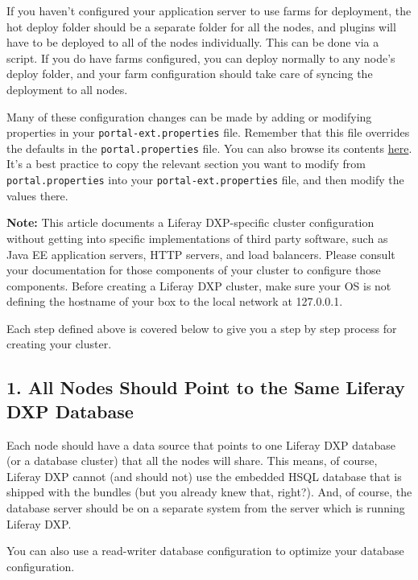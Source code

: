 If you haven't configured your application server to use farms for
deployment, the hot deploy folder should be a separate folder for all
the nodes, and plugins will have to be deployed to all of the nodes
individually. This can be done via a script. If you do have farms
configured, you can deploy normally to any node's deploy folder, and
your farm configuration should take care of syncing the deployment to
all nodes.

Many of these configuration changes can be made by adding or modifying
properties in your \texttt{portal-ext.properties} file. Remember that
this file overrides the defaults in the \texttt{portal.properties} file.
You can also browse its contents
\href{https://docs.liferay.com/digital-enterprise/7.0-latest/propertiesdoc/portal.properties.html}{here}.
It's a best practice to copy the relevant section you want to modify
from \texttt{portal.properties} into your \texttt{portal-ext.properties}
file, and then modify the values there.

\noindent\hrulefill

\textbf{Note:} This article documents a Liferay DXP-specific cluster
configuration without getting into specific implementations of third
party software, such as Java EE application servers, HTTP servers, and
load balancers. Please consult your documentation for those components
of your cluster to configure those components. Before creating a Liferay
DXP cluster, make sure your OS is not defining the hostname of your box
to the local network at 127.0.0.1.

\noindent\hrulefill

Each step defined above is covered below to give you a step by step
process for creating your cluster.

\subsection{1. All Nodes Should Point to the Same Liferay DXP
Database}\label{all-nodes-should-point-to-the-same-liferay-dxp-database}

Each node should have a data source that points to one Liferay DXP
database (or a database cluster) that all the nodes will share. This
means, of course, Liferay DXP cannot (and should not) use the embedded
HSQL database that is shipped with the bundles (but you already knew
that, right?). And, of course, the database server should be on a
separate system from the server which is running Liferay DXP.

You can also use a read-writer database configuration to optimize your
database configuration.

